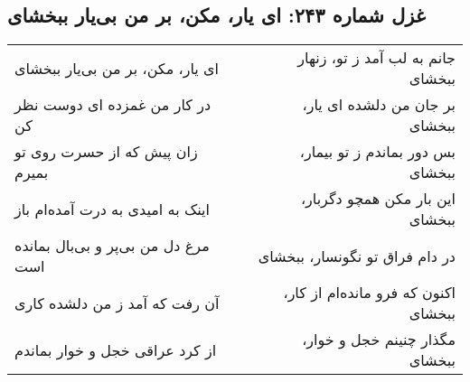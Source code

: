 \begin{center}
\section*{غزل شماره ۲۴۳: ای یار، مکن، بر من بی‌یار ببخشای}
\label{sec:243}
\begin{longtable}{l p{0.5cm} r}
ای یار، مکن، بر من بی‌یار ببخشای
&&
جانم به لب آمد ز تو، زنهار ببخشای
\\
در کار من غمزده ای دوست نظر کن
&&
بر جان من دلشده ای یار، ببخشای
\\
زان پیش که از حسرت روی تو بمیرم
&&
بس دور بماندم ز تو بیمار، ببخشای
\\
اینک به امیدی به درت آمده‌ام باز
&&
این بار مکن همچو دگربار، ببخشای
\\
مرغ دل من بی‌پر و بی‌بال بمانده است
&&
در دام فراق تو نگونسار، ببخشای
\\
آن رفت که آمد ز من دلشده کاری
&&
اکنون که فرو مانده‌ام از کار، ببخشای
\\
از کرد عراقی خجل و خوار بماندم
&&
مگذار چنینم خجل و خوار، ببخشای
\\
\end{longtable}
\end{center}
